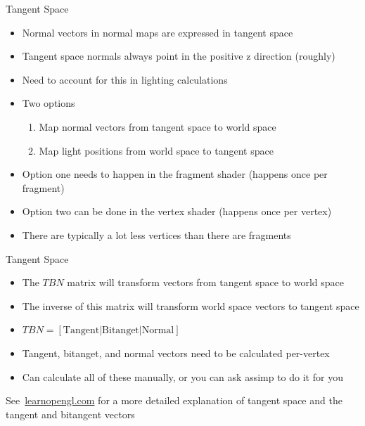 \documentclass{beamer}
\newcommand{\hrefhand}[2]{\raisebox{-0.4ex}{\HandRight}\,\href{#1}{#2}}
\begin{document}
\begin{frame}[fragile]{Tangent Space}
    \begin{itemize}
        \item Normal vectors in normal maps are expressed in tangent space
        \item Tangent space normals always point in the positive z direction (roughly)
        \item Need to account for this in lighting calculations
        \item Two options
              \begin{enumerate}
                  \item Map normal vectors from tangent space to world space
                  \item Map light positions from world space to tangent space
              \end{enumerate}
        \item Option one needs to happen in the fragment shader (happens once per fragment)
        \item Option two can be done in the vertex shader (happens once per vertex)
        \item There are typically a lot less vertices than there are fragments
    \end{itemize}
\end{frame}

\begin{frame}[fragile]{Tangent Space}
    \begin{itemize}
        \item The $TBN$ matrix will transform vectors from tangent space to world space
        \item The inverse of this matrix will transform world space vectors to tangent space
        \item $TBN = \left[\textrm{Tangent}|\textrm{Bitanget}|\textrm{Normal}\right]$
        \item Tangent, bitanget, and normal vectors need to be calculated per-vertex
        \item Can calculate all of these manually, or you can ask assimp to do it for you
    \end{itemize}
    \begin{examples}
        See \hrefhand{https://learnopengl.com/Advanced-Lighting/Normal-Mapping}{\color{blue}learnopengl.com} for a more detailed explanation of tangent space and the tangent and bitangent vectors
    \end{examples}
\end{frame}
\end{document}
